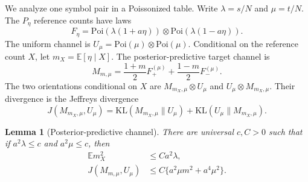 \documentclass{article}
\newtheorem{lemma}[theorem]{Lemma}
\newcommand{\E}{\mathbb E}
\newcommand{\KL}{\mathrm{KL}}
\newcommand{\Poi}{\mathrm{Poi}}
\begin{document}
We analyze one symbol pair in a Poissonized table. Write $\lambda=s/N$ and $\mu=t/N$. The $P_\eta$ reference counts have laws
\[
F_\eta=\Poi(\lambda(1+a\eta))\otimes\Poi(\lambda(1-a\eta)).
\]
The uniform channel is $U_\mu=\Poi(\mu)\otimes\Poi(\mu)$. Conditional on the reference count $X$, let $m_X=\E[\eta\mid X]$. The posterior-predictive target channel is
\[
M_{m,\mu}=\frac{1+m}{2}F_{+}^{(\mu)}+\frac{1-m}{2}F_{-}^{(\mu)}.
\]
The two orientations conditional on $X$ are $M_{m_X,\mu}\otimes U_\mu$ and $U_\mu\otimes M_{m_X,\mu}$. Their divergence is the Jeffreys divergence
\[
J(M_{m_X,\mu},U_\mu)=\KL(M_{m_X,\mu}\|U_\mu)+\KL(U_\mu\|M_{m_X,\mu}).
\]

\begin{lemma}[Posterior-predictive channel]
\label{lem:dense-channel}
There are universal $c,C>0$ such that if $a^2\lambda\leq c$ and $a^2\mu\leq c$, then
\begin{align*}
\E m_X^2&\leq Ca^2\lambda,\\
J(M_{m,\mu},U_\mu)&\leq C\{a^2\mu m^2+a^4\mu^2\}.
\end{align*}
\end{lemma}
\end{document}

